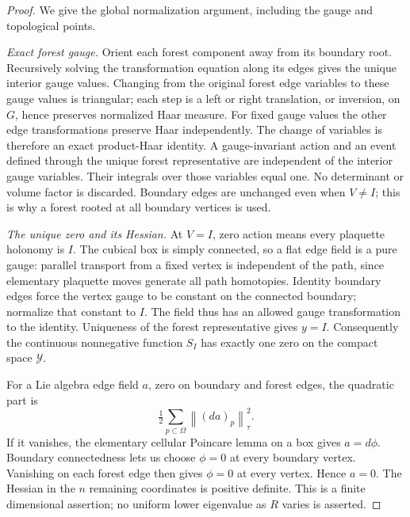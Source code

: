 \documentclass[11pt]{article}
\newcommand{\norm}[1]{\left\lVert#1\right\rVert}
\theoremstyle{remark}
\begin{document}
\begin{proof}
We give the global normalization argument, including the gauge and
topological points.

\emph{Exact forest gauge.}
Orient each forest component away from its boundary root. Recursively
solving the transformation equation along its edges gives the unique
interior gauge values. Changing from the original forest edge variables
to these gauge values is triangular; each step is a left or right
translation, or inversion, on \(G\), hence preserves normalized Haar
measure. For fixed gauge values the other edge transformations preserve
Haar independently. The change of variables is therefore an exact
product-Haar identity. A gauge-invariant action and an event defined
through the unique forest representative are independent of the
interior gauge variables. Their integrals over those variables equal
one. No determinant or volume factor is discarded. Boundary edges
are unchanged even when \(V\ne I\); this is why a forest rooted at
all boundary vertices is used.

\emph{The unique zero and its Hessian.}
At \(V=I\), zero action means every plaquette holonomy is \(I\).
The cubical box is simply connected, so a flat edge field is a pure
gauge: parallel transport from a fixed vertex is independent of the
path, since elementary plaquette moves generate all path homotopies.
Identity boundary edges force the vertex gauge to be constant on the
connected boundary; normalize that constant to \(I\). The field
thus has an allowed gauge transformation to the identity. Uniqueness
of the forest representative gives \(y=I\). Consequently the
continuous nonnegative function \(S_I\) has exactly one zero on the
compact space \(\mathcal Y\).

For a Lie algebra edge field \(a\), zero on boundary and forest edges,
the quadratic part is
\[
 \tfrac12\sum_{p\subset\Omega}\norm{(da)_p}_\tau^2.
\]
If it vanishes, the elementary cellular Poincare lemma on a box gives
\(a=d\phi\). Boundary connectedness lets us choose \(\phi=0\) at
every boundary vertex. Vanishing on each forest edge then gives
\(\phi=0\) at every vertex. Hence \(a=0\). The Hessian in the \(n\)
remaining coordinates is positive definite. This is a finite
dimensional assertion; no uniform lower eigenvalue as \(R\) varies
is asserted.


\end{proof}
\end{document}
